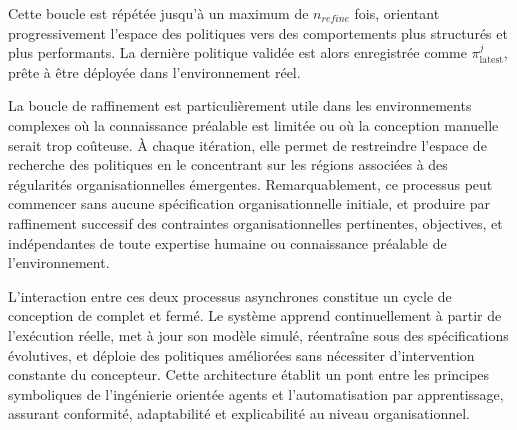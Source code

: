 Cette boucle est répétée jusqu'à un maximum de $n_{refine}$ fois, orientant progressivement l'espace des politiques vers des comportements plus structurés et plus performants. La dernière politique validée est alors enregistrée comme $\pi^j_{\text{latest}}$, prête à être déployée dans l'environnement réel.

La boucle de raffinement est particulièrement utile dans les environnements complexes où la connaissance préalable est limitée ou où la conception manuelle serait trop coûteuse. À chaque itération, elle permet de restreindre l'espace de recherche des politiques en le concentrant sur les régions associées à des régularités organisationnelles émergentes. Remarquablement, ce processus peut commencer sans aucune spécification organisationnelle initiale, et produire par raffinement successif des contraintes organisationnelles pertinentes, objectives, et indépendantes de toute expertise humaine ou connaissance préalable de l'environnement.

\noindent L'interaction entre ces deux processus asynchrones constitue un cycle de conception de  complet et fermé. Le système apprend continuellement à partir de l'exécution réelle, met à jour son modèle simulé, réentraîne sous des spécifications évolutives, et déploie des politiques améliorées sans nécessiter d'intervention constante du concepteur. Cette architecture établit un pont entre les principes symboliques de l'ingénierie orientée agents et l'automatisation par apprentissage, assurant conformité, adaptabilité et explicabilité au niveau organisationnel.

